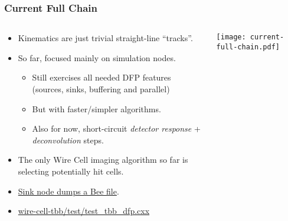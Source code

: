 \documentclass[xcolor=dvipsnames]{beamer}
\begin{document}
\begin{frame}
  \frametitle{Current Full Chain}
  \begin{columns}
    \begin{column}{0.55\textwidth}
      \footnotesize
      \begin{itemize}
      \item Kinematics are just trivial straight-line ``tracks''.
      \item So far, focused mainly on simulation nodes.
        \begin{itemize}\scriptsize
        \item Still exercises all needed DFP features (sources, sinks, buffering and parallel)
        \item But with faster/simpler algorithms.
        \item Also for now, short-circuit \textit{detector response} + \textit{deconvolution} steps.
        \end{itemize}
      \item The only Wire Cell imaging algorithm so far is selecting potentially hit cells.
      \item \href{http://www.phy.bnl.gov/wire-cell/bee/set/18872eff-92ec-4e18-a8d0-645b9fc1e5aa/event/0/}{Sink node dumps a Bee file}.
      \item \href{https://github.com/WireCell/wire-cell-tbb/blob/master/test/test\_tbb\_dfp.cxx}{wire-cell-tbb/test/test\_tbb\_dfp.cxx}

      \end{itemize}
    \end{column}
    \begin{column}{0.5\textwidth}
      \vspace{-10mm}
      \texttt{[image: current-full-chain.pdf]}
    \end{column}
  \end{columns}
\end{frame}
\end{document}
